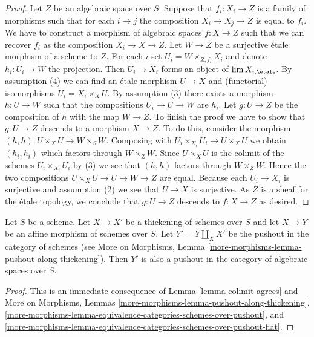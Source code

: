 \begin{proof}
Let $Z$ be an algebraic space over $S$. Suppose that $f_i : X_i \to Z$ is
a family of morphisms such that for each $i \to j$ the composition
$X_i \to X_j \to Z$ is equal to $f_i$. We have to construct a morphism
of algebraic spaces $f : X \to Z$ such that we can recover $f_i$ as
the composition $X_i \to X \to Z$. Let $W \to Z$ be a surjective
\'etale morphism of a scheme to $Z$. For each $i$ set
$U_i = W \times_{Z, f_i} X_i$ and denote $h_i : U_i \to W$ the projection.
Then $U_i \to X_i$ forms an object of $\lim X_{i, \etale}$. By
assumption (4) we can find an \'etale morphism $U \to X$ and (functorial)
isomorphisms $U_i = X_i \times_X U$. By assumption (3) there exists a morphism
$h : U \to W$ such that the compositions $U_i \to U \to W$ are $h_i$.
Let $g : U \to Z$ be the composition of $h$ with the map $W \to Z$. To
finish the proof we have to show that $g : U \to Z$ descends to a morphism
$X \to Z$. To do this, consider the morphism
$(h, h) : U \times_X U \to W \times_S W$.
Composing with $U_i \times_{X_i} U_i \to U \times_X U$ we obtain
$(h_i, h_i)$ which factors through $W \times_Z W$. Since $U \times_X U$
is the colimit of the schemes $U_i \times_{X_i} U_i$ by (3) we see
that $(h, h)$ factors through $W \times_Z W$. Hence the two compositions
$U \times_X U \to U \to W \to Z$ are equal. Because each $U_i \to X_i$ is
surjective and assumption (2) we see that $U \to X$ is surjective.
As $Z$ is a sheaf for the \'etale topology, we conclude that
$g : U \to Z$ descends to $f : X \to Z$ as desired.
\end{proof}

\begin{lemma}
\label{lemma-pushout-along-thickening-schemes}
Let $S$ be a scheme. Let $X \to X'$ be a thickening of schemes
over $S$ and let $X \to Y$ be an affine morphism of schemes over $S$.
Let $Y' = Y \amalg_X X'$ be the pushout in the category of schemes (see
More on Morphisms, Lemma \ref{more-morphisms-lemma-pushout-along-thickening}).
Then $Y'$ is also a pushout in the category of algebraic spaces over $S$.
\end{lemma}

\begin{proof}
This is an immediate consequence of Lemma \ref{lemma-colimit-agrees} and
More on Morphisms, Lemmas
\ref{more-morphisms-lemma-pushout-along-thickening},
\ref{more-morphisms-lemma-equivalence-categories-schemes-over-pushout}, and
\ref{more-morphisms-lemma-equivalence-categories-schemes-over-pushout-flat}.
\end{proof}

